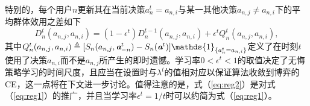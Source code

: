 特别的，每个用户$n$更新其在当前决策$a^t_n=a_{n,i}$与某一其他决策$a_{n,j}\neq a_{n,i}$下的平均群体效用之差如下
\begin{equation}\label{eq:reg2}
D^t_n(a_{n,j},a_{n,i})=(1-\epsilon^t)D^{t-1}_n(a_{n,j},a_{n,i})+\epsilon^tQ^t_n(a_{n,j},a_{n,i}),
\end{equation}
其中$Q^t_n(a_{n,j},a_{n,i})\triangleq[S_n(a_{n,j},\A^t_{-n})-S_n(\A^t)]\mathds{1}_{\{a^t_n=a_{n,i}\}}$定义了在时刻$t$使用了决策$a_{n,i}$而不是$a_{n,j}$所产生的即时遗憾。学习率$0<\epsilon^t<1$的取值决定了无悔策略学习的时间尺度，且应当在设置时与$\lambda^t$的值相对应以保证算法收敛到博弈的CE，这一点将在下文进一步讨论。值得注意的是，式（\ref{eq:reg2}）是对式（\ref{eq:reg1}）的推广，并且当学习率$\epsilon^t=1/t$时可以约简为式（\ref{eq:reg1}）。

